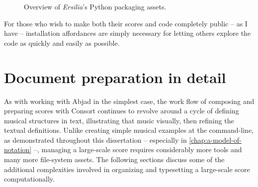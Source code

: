 \begin{figure}[h!]
\begin{singlespacing}
\vspace{-0.5\baselineskip}
\end{singlespacing}
\caption{Overview of \emph{Ersilia}'s Python packaging assets.}
\end{figure}

For those who wish to make both their scores and code completely public -- as I
have -- installation affordances are simply necessary for letting others
explore the code as quickly and easily as possible.

\section{Document preparation in detail}
\label{sec:document-preparation-in-detail}

As with working with Abjad in the simplest case, the work flow of composing and
preparing scores with Consort continues to revolve around a cycle of defining
musical structures in text, illustrating that music visually, then refining the
textual definitions. Unlike creating simple musical examples at the
command-line, as demonstrated throughout this dissertation -- especially in
\autoref{chap:a-model-of-notation} --, managing a large-scale score requires
considerably more tools and many more file-system assets. The following
sections discuss some of the additional complexities involved in organizing and
typesetting a large-scale score computationally.

